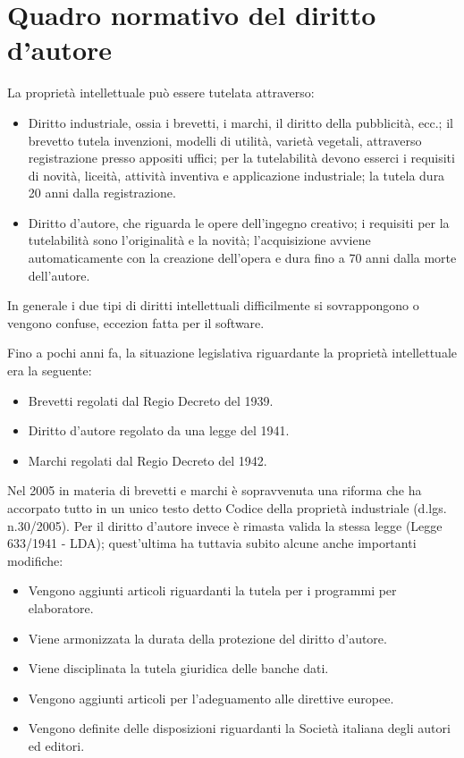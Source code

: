 \section{Quadro normativo del diritto d’autore}

La proprietà intellettuale può essere tutelata attraverso:
\begin{itemize}
    \item Diritto industriale, ossia i brevetti, i marchi, il diritto della pubblicità, ecc.; il brevetto tutela invenzioni, modelli di utilità, varietà vegetali, attraverso registrazione presso appositi uffici; per la tutelabilità devono esserci i requisiti di novità, liceità, attività inventiva e applicazione industriale; la tutela dura 20 anni dalla registrazione.
    \item Diritto d’autore, che riguarda le opere dell’ingegno creativo; i requisiti per la tutelabilità sono l’originalità e la novità; l’acquisizione avviene automaticamente con la creazione dell’opera e dura fino a 70 anni dalla morte dell’autore.
\end{itemize}

In generale i due tipi di diritti intellettuali difficilmente si sovrappongono o vengono confuse, eccezion fatta per
il software.

Fino a pochi anni fa, la situazione legislativa riguardante la proprietà intellettuale era la seguente:
\begin{itemize}
    \item Brevetti regolati dal Regio Decreto del 1939.
    \item Diritto d’autore regolato da una legge del 1941.
    \item Marchi regolati dal Regio Decreto del 1942.
\end{itemize}

Nel 2005 in materia di brevetti e marchi è sopravvenuta una riforma che ha accorpato tutto in un unico testo detto Codice della proprietà industriale (d.lgs. n.30/2005). Per il diritto d’autore invece è rimasta valida la stessa legge (Legge 633/1941 - LDA); quest’ultima ha tuttavia subito alcune anche importanti modifiche: 
\begin{itemize}
    \item Vengono aggiunti articoli riguardanti la tutela per i programmi per elaboratore.
    \item Viene armonizzata la durata della protezione del diritto d’autore.
    \item Viene disciplinata la tutela giuridica delle banche dati.
    \item Vengono aggiunti articoli per l’adeguamento alle direttive europee.
    \item Vengono definite delle disposizioni riguardanti la Società italiana degli autori ed editori.
\end{itemize}

